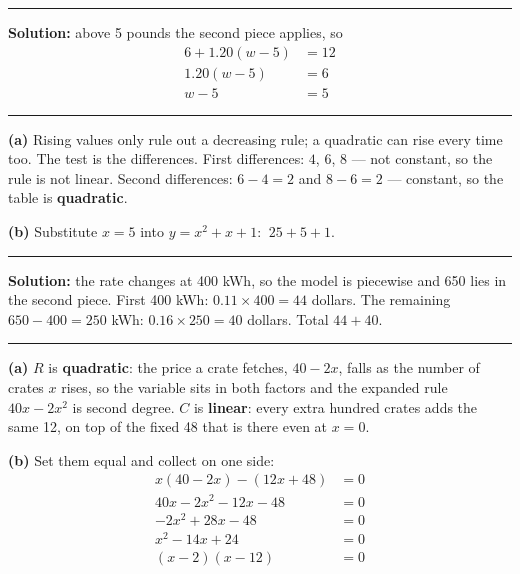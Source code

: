 \documentclass[12pt]{article}
\begin{document}
\vspace{0.2cm}\noindent\rule{\linewidth}{0.2pt}


\textbf{Solution:} above 5 pounds the second piece applies, so
\begin{align*}
  6 + 1.20(w - 5) &= 12 \\
  1.20(w - 5) &= 6 \\
  w - 5 &= 5
\end{align*}

\vspace{0.2cm}\noindent\rule{\linewidth}{0.2pt}


\textbf{(a)} Rising values only rule out a decreasing rule; a quadratic can rise every time too. The test is the differences. First differences: $4$, $6$, $8$ --- not constant, so the rule is not linear. Second differences: $6 - 4 = 2$ and $8 - 6 = 2$ --- constant, so the table is \textbf{quadratic}.

\textbf{(b)} Substitute $x = 5$ into $y = x^2 + x + 1$: $\ 25 + 5 + 1$. 

\vspace{0.2cm}\noindent\rule{\linewidth}{0.2pt}


\textbf{Solution:} the rate changes at 400 kWh, so the model is piecewise and 650 lies in the second piece. First 400 kWh: $0.11 \times 400 = 44$ dollars. The remaining $650 - 400 = 250$ kWh: $0.16 \times 250 = 40$ dollars. Total $44 + 40$. 

\vspace{0.2cm}\noindent\rule{\linewidth}{0.2pt}


\textbf{(a)} $R$ is \textbf{quadratic}: the price a crate fetches, $40 - 2x$, falls as the number of crates $x$ rises, so the variable sits in both factors and the expanded rule $40x - 2x^2$ is second degree. $C$ is \textbf{linear}: every extra hundred crates adds the same 12, on top of the fixed 48 that is there even at $x = 0$.

\textbf{(b)} Set them equal and collect on one side:
\begin{align*}
  x(40 - 2x) - (12x + 48) &= 0 \\
  40x - 2x^2 - 12x - 48 &= 0 \\
  -2x^2 + 28x - 48 &= 0 \\
  x^2 - 14x + 24 &= 0 \\
  (x - 2)(x - 12) &= 0
\end{align*}
\end{document}
